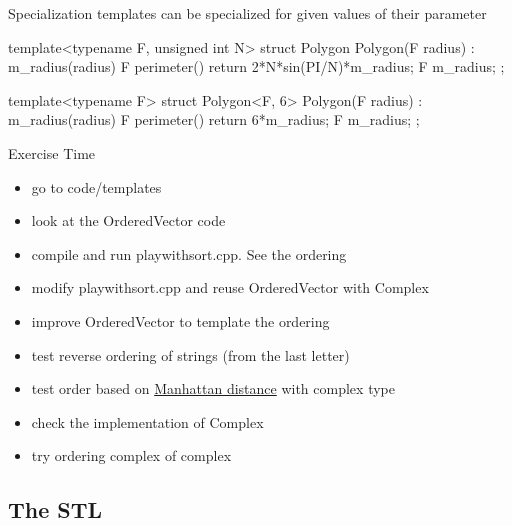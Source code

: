 \begin{frame}[fragile]
  \begin{block}{Specialization}
    templates can be specialized for given values of their parameter
  \end{block}
  \begin{cppcode*}{}
    template<typename F, unsigned int N> struct Polygon {
      Polygon(F radius) : m_radius(radius) {}
      F perimeter() {return 2*N*sin(PI/N)*m_radius;}
      F m_radius;
    };
    
    template<typename F>
    struct Polygon<F, 6> {
      Polygon(F radius) : m_radius(radius) {}
      F perimeter() {return 6*m_radius;}
      F m_radius;
    };
  \end{cppcode*}
\end{frame}

\begin{frame}[fragile]
  \begin{alertblock}{Exercise Time}
    \begin{itemize}
    \item go to code/templates
    \item look at the OrderedVector code
    \item compile and run playwithsort.cpp. See the ordering
    \item modify playwithsort.cpp and reuse OrderedVector with Complex
    \item improve OrderedVector to template the ordering
    \item test reverse ordering of strings (from the last letter)
    \item test order based on {\color{blue} \href{https://en.wikipedia.org/wiki/Taxicab_geometry}{Manhattan distance}} with complex type
    \item check the implementation of Complex
    \item try ordering complex of complex
    \end{itemize}
  \end{alertblock}
\end{frame}

\subsection[STL]{The STL}

